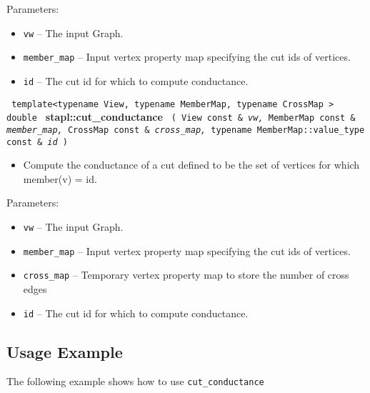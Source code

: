 Parameters:
\begin{itemize}
\item
\texttt{vw} --
The input Graph.
\item
\texttt{member\_map} --
Input vertex property map specifying the cut ids of vertices.
\item
\texttt{id} --
The cut id for which to compute conductance.
\end{itemize}


\noindent
\texttt{%
template<typename View, typename MemberMap, typename CrossMap >
\newline
double 
}
\textbf{stapl::cut\_conductance}%
\newline
\texttt{%
(
View const \&
\textit{vw,}%
MemberMap const \&
\textit{member\_map,}%
CrossMap const \&
\textit{cross\_map,}%
typename MemberMap::value\_type const \&
\textit{id}%
)     
}
\vspace{0.4cm}

\begin{itemize}
\item
Compute the conductance of a cut defined to be the set of vertices for which member(v) = id.
\end{itemize}

Parameters:
\begin{itemize}
\item
\texttt{vw} --
The input Graph.
\item
\texttt{member\_map} --
Input vertex property map specifying the cut ids of vertices.
\item
\texttt{cross\_map} --
Temporary vertex property map to store the number of cross edges
\item
\texttt{id} --
The cut id for which to compute conductance.
\end{itemize}

\subsection{Usage Example} \label{sec-cut-cond-alg-use}

The following example shows how to use 
\texttt{cut\_conductance}


